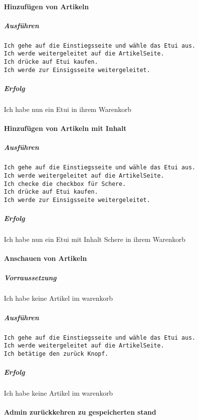 \documentclass[a4paper, 11pt]{article}
\begin{document}
\paragraph{Hinzufügen von Artikeln}

\subparagraph{Ausführen}

\begin{verbatim}
Ich gehe auf die Einstiegsseite und wähle das Etui aus.
Ich werde weitergeleitet auf die ArtikelSeite.
Ich drücke auf Etui kaufen.
Ich werde zur Einsigsseite weitergeleitet.
\end{verbatim}

\subparagraph{Erfolg}

Ich habe nun ein Etui in ihrem Warenkorb

\paragraph{Hinzufügen von Artikeln mit Inhalt}

\subparagraph{Ausführen}

\begin{verbatim}
Ich gehe auf die Einstiegsseite und wähle das Etui aus.
Ich werde weitergeleitet auf die ArtikelSeite.
Ich checke die checkbox für Schere.
Ich drücke auf Etui kaufen.
Ich werde zur Einsigsseite weitergeleitet.
\end{verbatim}

\subparagraph{Erfolg}

Ich habe nun ein Etui mit Inhalt Schere in ihrem Warenkorb

\paragraph{Anschauen von Artikeln}

\subparagraph{Vorraussetzung}

Ich habe keine Artikel im warenkorb

\subparagraph{Ausführen}

\begin{verbatim}
Ich gehe auf die Einstiegsseite und wähle das Etui aus.
Ich werde weitergeleitet auf die ArtikelSeite.
Ich betätige den zurück Knopf.
\end{verbatim}

\subparagraph{Erfolg}

Ich habe keine Artikel im warenkorb

\paragraph{Admin zurückkehren zu gespeicherten stand}
\end{document}
